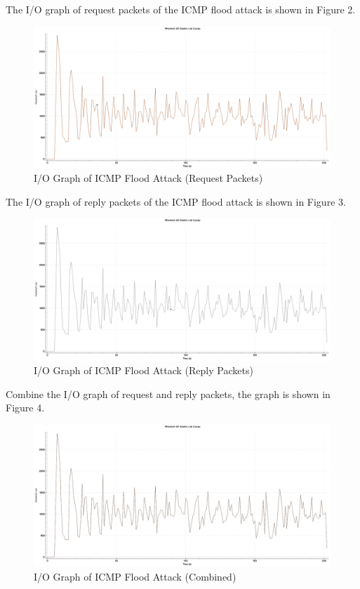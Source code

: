 \documentclass{article}
\begin{document}
    The I/O graph of request packets of the ICMP flood attack is shown in Figure 2.

    \begin{figure}[H]
        \centering
        \includegraphics[width=\textwidth]{image/131_icmp.png}
        \caption{I/O Graph of ICMP Flood Attack (Request Packets)}
        \label{fig:icmp-flood-io-graph-request}
    \end{figure}

    The I/O graph of reply packets of the ICMP flood attack is shown in Figure 3.

    \begin{figure}[H]
        \centering
        \includegraphics[width=\textwidth]{image/56_icmp.png}
        \caption{I/O Graph of ICMP Flood Attack (Reply Packets)}
        \label{fig:icmp-flood-io-graph-reply}
    \end{figure}

    Combine the I/O graph of request and reply packets, the graph is shown in Figure 4.

    \begin{figure}[H]
        \centering
        \includegraphics[width=\textwidth]{image/131_56_icmp.png}
        \caption{I/O Graph of ICMP Flood Attack (Combined)}
        \label{fig:icmp-flood-io-graph-combine}
    \end{figure}
\end{document}

